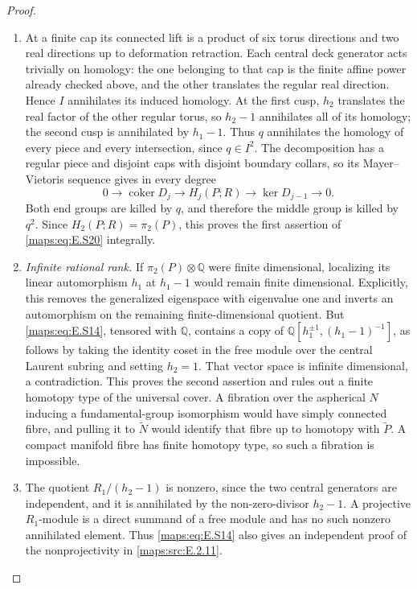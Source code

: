 \begin{proof}
\begin{enumerate}[label={$\langle1\rangle$\arabic*.},leftmargin=*]
\item At a finite cap its connected lift is a product of six torus
directions and two real directions up to deformation retraction.
Each central deck generator acts trivially on homology: the
one belonging to that cap is the finite affine power already
checked above, and the other translates the regular real
direction. Hence $I$ annihilates its induced homology. At the
first cusp, $h_2$ translates the real factor of the other
regular torus, so $h_2-1$ annihilates all of its homology;
the second cusp is annihilated by $h_1-1$. Thus $q$ annihilates
the homology of every piece and every intersection, since
$q\in I^2$. The decomposition has a regular piece and disjoint
caps with disjoint boundary collars, so its Mayer--Vietoris
sequence gives in every degree
\[
 0\longrightarrow\operatorname{coker}D_j
   \longrightarrow H_j(P;R)
   \longrightarrow\ker D_{j-1}\longrightarrow0.
\]
Both end groups are killed by $q$, and therefore the middle
group is killed by $q^2$. Since $H_2(P;R)=\pi_2(P)$, this
proves the first assertion of \eqref{maps:eq:E.S20} integrally.

\item \emph{Infinite rational rank.}
If $\pi_2(P)\otimes\mathbb Q$ were finite dimensional,
localizing its linear automorphism $h_1$ at $h_1-1$ would
remain finite dimensional. Explicitly, this removes the
generalized eigenspace with eigenvalue one and inverts an
automorphism on the remaining finite-dimensional quotient.
But \eqref{maps:eq:E.S14}, tensored with $\mathbb Q$, contains a copy of
$\mathbb Q[h_1^{\pm1},(h_1-1)^{-1}]$, as follows by taking
the identity coset in the free module over the central
Laurent subring and setting $h_2=1$. That vector space is
infinite dimensional, a contradiction. This proves the
second assertion and rules out a finite homotopy type of
the universal cover. A fibration over the aspherical $N$
inducing a fundamental-group isomorphism would have simply
connected fibre, and pulling it to $\widetilde N$ would
identify that fibre up to homotopy with $\widetilde P$.
A compact manifold fibre has finite homotopy type, so such
a fibration is impossible.

\item The quotient $R_1/(h_2-1)$ is nonzero, since the two central
generators are independent, and it is annihilated by the
non-zero-divisor $h_2-1$. A projective $R_1$-module is a
direct summand of a free module and has no such nonzero
annihilated element. Thus \eqref{maps:eq:E.S14} also gives an independent
proof of the nonprojectivity in \ref{maps:src:E.2.11}. \end{enumerate}
\end{proof}

